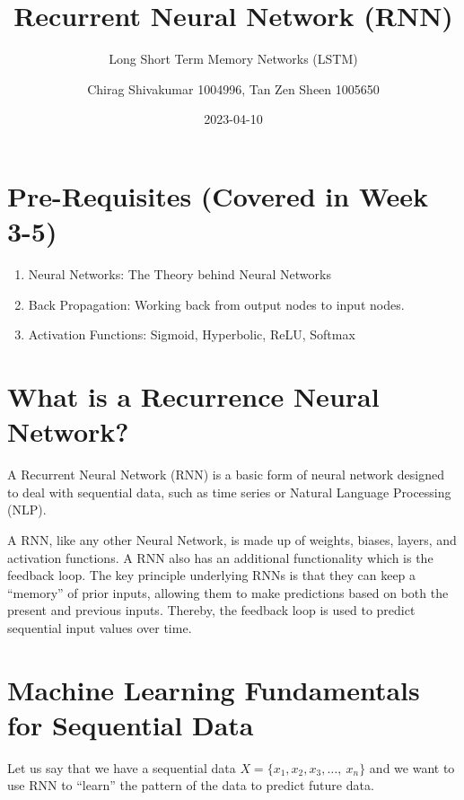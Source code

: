 \documentclass[
]{article}
\title{Recurrent Neural Network (RNN)}
\subtitle{Long Short Term Memory Networks (LSTM)}
\author{Chirag Shivakumar 1004996, Tan Zen Sheen 1005650}
\date{2023-04-10}
\providecommand{\tightlist}{%
  \setlength{\itemsep}{0pt}\setlength{\parskip}{0pt}}
\begin{document}
\maketitle

\hypertarget{pre-requisites-covered-in-week-3-5}{%
\section{Pre-Requisites (Covered in Week
3-5)}\label{pre-requisites-covered-in-week-3-5}}

\begin{enumerate}
\def\labelenumi{\arabic{enumi}.}
\tightlist
\item
  Neural Networks: The Theory behind Neural Networks
\item
  Back Propagation: Working back from output nodes to input nodes.
\item
  Activation Functions: Sigmoid, Hyperbolic, ReLU, Softmax
\end{enumerate}

\hypertarget{what-is-a-recurrence-neural-network}{%
\section{What is a Recurrence Neural
Network?}\label{what-is-a-recurrence-neural-network}}

A Recurrent Neural Network (RNN) is a basic form of neural network
designed to deal with sequential data, such as time series or Natural
Language Processing (NLP).

A RNN, like any other Neural Network, is made up of weights, biases,
layers, and activation functions. A RNN also has an additional
functionality which is the feedback loop. The key principle underlying
RNNs is that they can keep a ``memory'' of prior inputs, allowing them
to make predictions based on both the present and previous inputs.
Thereby, the feedback loop is used to predict sequential input values
over time.

\hypertarget{machine-learning-fundamentals-for-sequential-data}{%
\section{Machine Learning Fundamentals for Sequential
Data}\label{machine-learning-fundamentals-for-sequential-data}}

Let us say that we have a sequential data
\(X = \{ x_{1},x_{2},x_{3},\ldots,\ x_{n}\}\) and we want to use RNN to
``learn'' the pattern of the data to predict future data.
\end{document}
